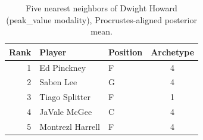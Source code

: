 \begin{table}[htbp]
  \centering\small
  \begin{tabular}{rllc}
    \toprule
    Rank & Player & Position & Archetype \\
    \midrule
    1 & Ed Pinckney & F & 4 \\
    2 & Saben Lee & G & 4 \\
    3 & Tiago Splitter & F & 1 \\
    4 & JaVale McGee & C & 4 \\
    5 & Montrezl Harrell & F & 4 \\
    \bottomrule
  \end{tabular}
  \caption{Five nearest neighbors of Dwight Howard (peak_value modality), Procrustes-aligned posterior mean.}
  \label{tab:Dwight_Howard_neighbors_peak_value}
\end{table}

